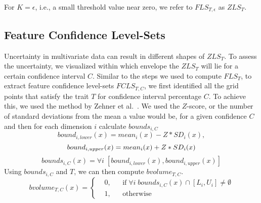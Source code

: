 For $K = \epsilon$, i.e., a small threshold value near zero, we refer to $FLS_{T,\epsilon}$ as $ZLS_{T}$.
%
%



\vspace{-2mm}
\subsection{Feature Confidence Level-Sets}
\label{sec:fcls}

%
Uncertainty in multivariate data can result in different shapes of $ZLS_{T}$.
%
To assess the uncertainty, we visualized within which envelope the $ZLS_{T}$ will lie for a certain confidence interval $C$.
%
Similar to the steps we used to compute $FLS_{T}$, to extract feature confidence level-sets $FCLS_{T,C}$, we first identified all the grid points that satisfy the trait $T$ for confidence interval percentage $C$.
%
To achieve this, we used the method by Zehner et al.~\cite{zehner2010visualization}. 
%
We used the $Z$-score, or the number of standard deviations from the mean a value would be, for a given confidence $C$ and then for each dimension $i$ calculate $bounds_{i,C}$
\begin{equation}
bound_{i,lower}(x) = mean_{i}(x) - Z*SD_{i}(x),
\end{equation}
\begin{equation}
bound_{i,upper}(x) = mean_{i}(x) + Z*SD_{i}(x)\\
\end{equation}
\begin{equation}
bounds_{i,C}(x) = \forall i \; [bound_{i, lower}(x), bound_{i,upper}(x)]
\end{equation}
%
Using $bounds_{i,C}$ and $T$, we can then compute $bvolume_{T,C}$.
\begin{equation}
  bvolume_{T,C}(x) = \left \{
  \begin{aligned}
    &0, && \text{if}\; \forall i\; bounds_{i, C}(x) \cap [L_{i}, U_{i}] \neq \emptyset \\
    &1, && \text{otherwise}
  \end{aligned} \right.
\end{equation}

